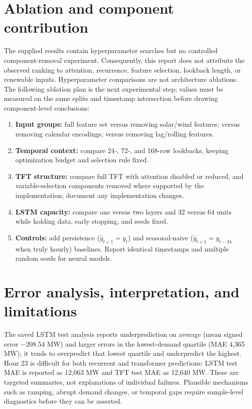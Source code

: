 \documentclass[12pt,a4paper]{article}
\begin{document}
\section{Ablation and component contribution}
The supplied results contain hyperparameter searches but no controlled component-removal experiment. Consequently, this report does not attribute the observed ranking to attention, recurrence, feature selection, lookback length, or renewable inputs. Hyperparameter comparisons are not architecture ablations. The following ablation plan is the next experimental step; values must be measured on the same splits and timestamp intersection before drawing component-level conclusions:
\begin{enumerate}[leftmargin=*]
\item \textbf{Input groups:} full feature set versus removing solar/wind features; versus removing calendar encodings; versus removing lag/rolling features.
\item \textbf{Temporal context:} compare 24-, 72-, and 168-row lookbacks, keeping optimization budget and selection rule fixed.
\item \textbf{TFT structure:} compare full TFT with attention disabled or reduced, and variable-selection components removed where supported by the implementation; document any implementation changes.
\item \textbf{LSTM capacity:} compare one versus two layers and 32 versus 64 units while holding data, early stopping, and seeds fixed.
\item \textbf{Controls:} add persistence ($\hat y_{t+1}=y_t$) and seasonal-naive ($\hat y_{t+1}=y_{t-24}$ when truly hourly) baselines. Report identical timestamps and multiple random seeds for neural models.
\end{enumerate}
\section{Error analysis, interpretation, and limitations}
The saved LSTM test analysis reports underprediction on average (mean signed error $-208.54$ MW) and larger errors in the lowest-demand quartile (MAE 4,365 MW); it tends to overpredict that lowest quartile and underpredict the highest. Hour 23 is difficult for both recurrent and transformer predictions: LSTM test MAE is reported as 12,063 MW and TFT test MAE as 12,640 MW. These are targeted summaries, not explanations of individual failures. Plausible mechanisms such as ramping, abrupt demand changes, or temporal gaps require sample-level diagnostics before they can be asserted.
\end{document}
